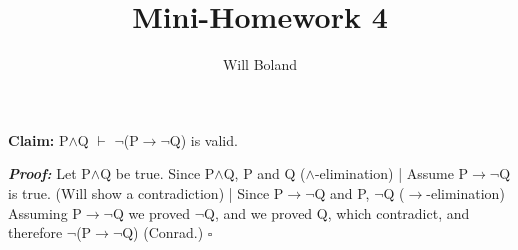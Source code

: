 \documentclass{article}
\begin{document}
\title{Mini-Homework 4}
\author{Will Boland}
\maketitle

\textbf{Claim: } P$\wedge$Q $\vdash$ $\neg$(P$\rightarrow$$\neg$Q) is valid. \newline\newline

\textbf{\textit{Proof: }}\newline
Let P$\wedge$Q be true.\newline
Since P$\wedge$Q, P and Q ($\wedge$-elimination)\newline
|	Assume P$\rightarrow$$\neg$Q is true. (Will show a contradiction)\newline
|	Since P$\rightarrow$$\neg$Q and P, $\neg$Q ($\rightarrow$-elimination)\newline
Assuming P$\rightarrow$$\neg$Q we proved $\neg$Q, and we proved Q, which contradict, and therefore $\neg$(P$\rightarrow$$\neg$Q) (Conrad.) $\square$\newline
\end{document}
